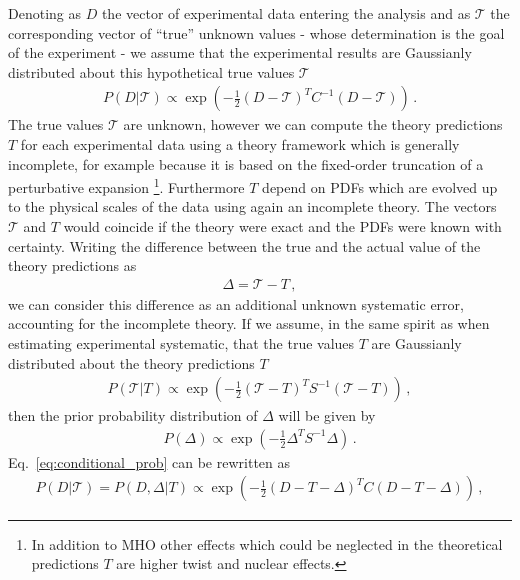 %
Denoting as $D$ the vector of experimental data entering the analysis and as $\mathcal{T}$ the corresponding vector of 
``true'' unknown values - whose determination is the goal of the experiment - we assume that the experimental results
are Gaussianly distributed about this hypothetical true values $\mathcal{T}$ 
\begin{align}
    \label{eq:conditional_prob}
    P\left(D|\mathcal{T}\right) \propto
    \exp\left(-\frac{1}{2}\left(D-\mathcal{T}\right)^T C^{-1} \left(D-\mathcal{T}\right)\right)\,.
\end{align}
The true values $\mathcal{T}$ are unknown, however we can compute the theory predictions $T$ 
for each experimental data using a theory framework which is 
generally incomplete, for example because it is based on the fixed-order truncation of a perturbative
expansion \footnote{In addition to MHO other effects which could be neglected in the theoretical predictions $T$ are 
higher twist and nuclear effects.}. Furthermore $T$ depend on PDFs which are evolved up to 
the physical scales of the data using again an incomplete theory. The vectors $\mathcal{T}$ and $T$ would coincide
if the theory were exact and the PDFs were known with certainty.
%
Writing the difference between the true and the actual value of the theory predictions as
\begin{align}
    \Delta = \mathcal{T} - T\,,
\end{align}
we can consider this difference as an additional unknown systematic error, accounting for the incomplete theory.
If we assume, in the same spirit as when estimating experimental systematic, that the true values $T$ are 
Gaussianly distributed about the theory predictions $T$
\begin{align}
    \label{eq:gaussian_hyp}
    P\left(\mathcal{T}|T\right) \propto 
    \exp\left(-\frac{1}{2}\left(\mathcal{T}-T\right)^T S^{-1} \left(\mathcal{T}-T\right)\right)\,,
\end{align}
then the prior probability distribution of $\Delta$ will be given by
\begin{align}
    P\left(\Delta\right) \propto \exp\left(-\frac{1}{2}\Delta^T S^{-1} \Delta\right)\,. 
\end{align}
Eq.~\ref{eq:conditional_prob} can be rewritten as
\begin{align}
    P\left(D|\mathcal{T}\right) = P\left(D, \Delta|T\right)  \propto 
    \exp\left(-\frac{1}{2}\left(D - T - \Delta\right)^T C \left(D-T-\Delta\right)\right)\,,   
\end{align}
